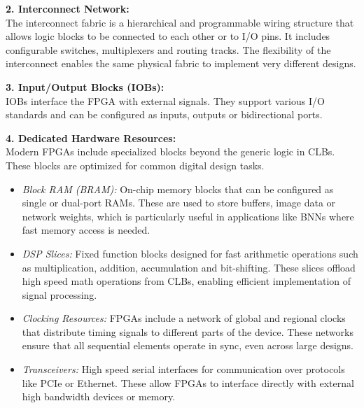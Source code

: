 \documentclass[a4paper,12pt]{report}
\begin{document}
\textbf{2. Interconnect Network:} \\
The interconnect fabric is a hierarchical and programmable wiring structure that allows logic blocks to be connected to each other or to I/O pins. It includes configurable switches, multiplexers and routing tracks. The flexibility of the interconnect enables the same physical fabric to implement very different designs. 

\textbf{3. Input/Output Blocks (IOBs):} \\ 
IOBs interface the FPGA with external signals. They support various I/O standards and can be configured as inputs, outputs or bidirectional ports.

\textbf{4. Dedicated Hardware Resources:} \\
Modern FPGAs include specialized blocks beyond the generic logic in CLBs. These blocks are optimized for common digital design tasks.
\begin{itemize}
    \item \textit{Block RAM (BRAM):} On-chip memory blocks that can be configured as single or dual-port RAMs. These are used to store buffers, image data or network weights, which is particularly useful in applications like BNNs where fast memory access is needed.
    \item \textit{DSP Slices:} Fixed function blocks designed for fast arithmetic operations such as multiplication, addition, accumulation and bit-shifting. These slices offload high speed math operations from CLBs, enabling efficient implementation of signal processing.
    \item \textit{Clocking Resources:} FPGAs include a network of global and regional clocks that distribute timing signals to different parts of the device. These networks ensure that all sequential elements operate in sync, even across large designs.
    \item \textit{Transceivers:} High speed serial interfaces for communication over protocols like PCIe or Ethernet. These allow FPGAs to interface directly with external high bandwidth devices or memory.
\end{itemize}
\end{document}
